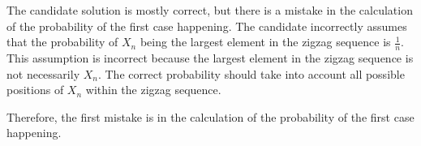 The candidate solution is mostly correct, but there is a mistake in the calculation of the probability of the first case happening. The candidate incorrectly assumes that the probability of \( X_n \) being the largest element in the zigzag sequence is \( \frac{1}{n} \). This assumption is incorrect because the largest element in the zigzag sequence is not necessarily \( X_n \). The correct probability should take into account all possible positions of \( X_n \) within the zigzag sequence.

Therefore, the first mistake is in the calculation of the probability of the first case happening.
